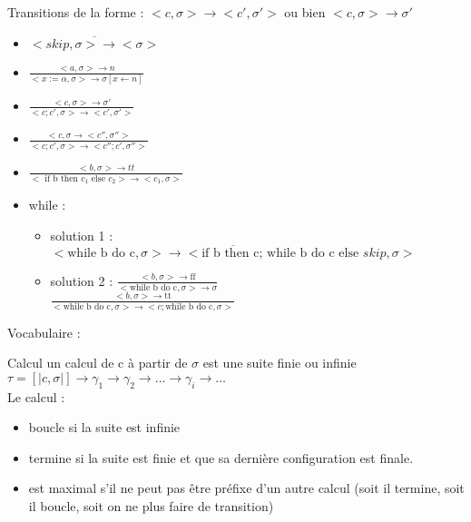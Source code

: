 \documentclass[10pt,a4paper]{article}
\newcommand{\semm}[1]{\left[| #1 | \right]}
\begin{document}
\noindent Transitions de la forme : $<c, \sigma> \rightarrow <c', \sigma'>$ ou bien $<c, \sigma> \rightarrow \sigma'$\\
\begin{itemize}


\item $\displaystyle \overline{ <skip, \sigma > \rightarrow <\sigma> }$\\
\item $\displaystyle\frac{<a, \sigma > \rightarrow n }{ < x := \alpha , \sigma > \rightarrow \sigma [x \leftarrow n ] }$\\
\item $\displaystyle \frac{ <c, \sigma > \rightarrow \sigma' }{  < c; c' , \sigma > \rightarrow <c', \sigma'> }$\\
\item $\displaystyle \frac{< c, \sigma \rightarrow <c'', \sigma''>}{ <c; c', \sigma > \rightarrow <c''; c', \sigma'' > }$\\
\item $\displaystyle \frac{ <b, \sigma> \rightarrow tt }{<\text{ if b then }  c_1\text{ else }c_2> \rightarrow <c_1, \sigma > }$\\
\item while : \begin{itemize}


 \item solution 1 : $\displaystyle \overline{ < \text{while b do c}, \sigma > \rightarrow < \text{if b then c; while b do c else }skip, \sigma > }$\\
 
\item solution 2 : $\displaystyle \frac{ < b, \sigma > \rightarrow \text{ff}}{ < \text{while b do c}, \sigma > \rightarrow \sigma }$\\

$\displaystyle  \frac{ < b, \sigma > \rightarrow \text{tt}}{ < \text{while b do c}, \sigma > \rightarrow <c;\text{while b do c}, \sigma >}$\\
\end{itemize}
\end{itemize}

Vocabulaire : 
\begin{definition}{Calcul} un calcul de c à partir de $\sigma$ est une suite finie ou infinie 
$\tau = \semm{c, \sigma} \rightarrow \gamma_1 \rightarrow \gamma_2 \rightarrow \dotsc \rightarrow \gamma_i \rightarrow \dotsc$\\
Le calcul :\begin{itemize}
\item boucle si la suite est infinie
\item termine si la suite est finie et que sa dernière configuration est finale.
\item est maximal s'il ne peut pas \^etre préfixe d'un autre calcul (soit il termine, soit il boucle, soit on ne plus faire de transition)
\end{itemize}
\end{definition}
\end{document}
